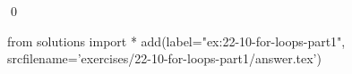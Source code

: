 
\begin{ex}
  \label{ex:22-10-for-loops-part1}
  
  \qed
\end{ex}
\begin{python0}
from solutions import *
add(label="ex:22-10-for-loops-part1",
    srcfilename='exercises/22-10-for-loops-part1/answer.tex')
\end{python0}
